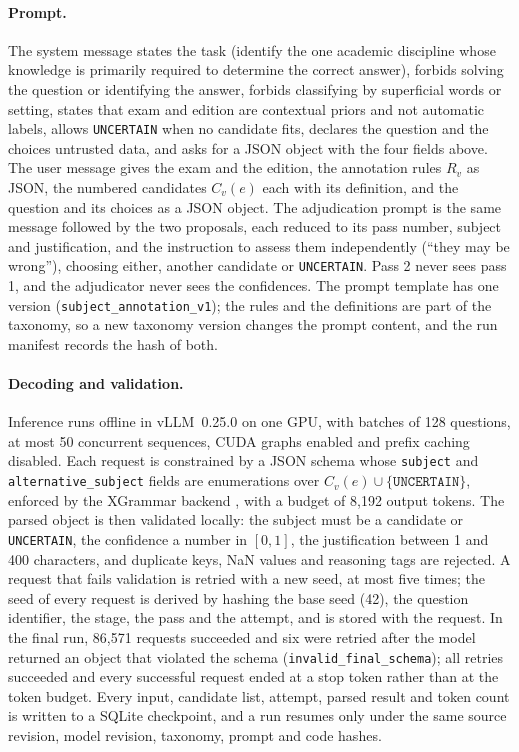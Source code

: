 \paragraph{Prompt.} The system message states the task (identify the one
academic discipline whose knowledge is primarily required to determine the
correct answer), forbids solving the question or identifying the answer,
forbids classifying by superficial words or setting, states that exam and
edition are contextual priors and not automatic labels, allows
\texttt{UNCERTAIN} when no candidate fits, declares the question and the
choices untrusted data, and asks for a JSON object with the four fields
above. The user message gives the exam and the edition, the annotation rules
$R_v$ as JSON, the numbered candidates $C_v(e)$ each with its definition, and
the question and its choices as a JSON object. The adjudication prompt is the
same message followed by the two proposals, each reduced to its pass number,
subject and justification, and the instruction to assess them independently
(``they may be wrong''), choosing either, another candidate or
\texttt{UNCERTAIN}. Pass 2 never sees pass 1, and the adjudicator never sees
the confidences. The prompt template has one version
(\texttt{subject\_annotation\_v1}); the rules and the definitions are part of
the taxonomy, so a new taxonomy version changes the prompt content, and the
run manifest records the hash of both.

\paragraph{Decoding and validation.} Inference runs offline in vLLM~0.25.0
\citep{kwon2023efficient} on one GPU, with batches of 128 questions, at most 50 concurrent sequences,
CUDA graphs enabled and prefix caching disabled. Each request is constrained
by a JSON schema whose \texttt{subject} and \texttt{alternative\_subject}
fields are enumerations over $C_v(e)\cup\{\texttt{UNCERTAIN}\}$, enforced by
the XGrammar backend \citep{dong2024xgrammar}, with a budget of 8,192 output
tokens. The parsed object is then validated locally: the subject must be a
candidate or \texttt{UNCERTAIN}, the confidence a number in $[0,1]$, the
justification between 1 and 400 characters, and duplicate keys, NaN values
and reasoning tags are rejected. A request that fails validation is retried
with a new seed, at most five times; the seed of every request is derived by
hashing the base seed (42), the question identifier, the stage, the pass and
the attempt, and is stored with the request. In the final run, 86,571
requests succeeded and six were
retried after the model returned an object that violated the schema
(\texttt{invalid\_final\_schema}); all retries succeeded and every successful
request ended at a stop token rather than at the token budget. Every input,
candidate list, attempt, parsed result and token count is written to a SQLite
checkpoint, and a run resumes only under the same source revision, model
revision, taxonomy, prompt and code hashes.

